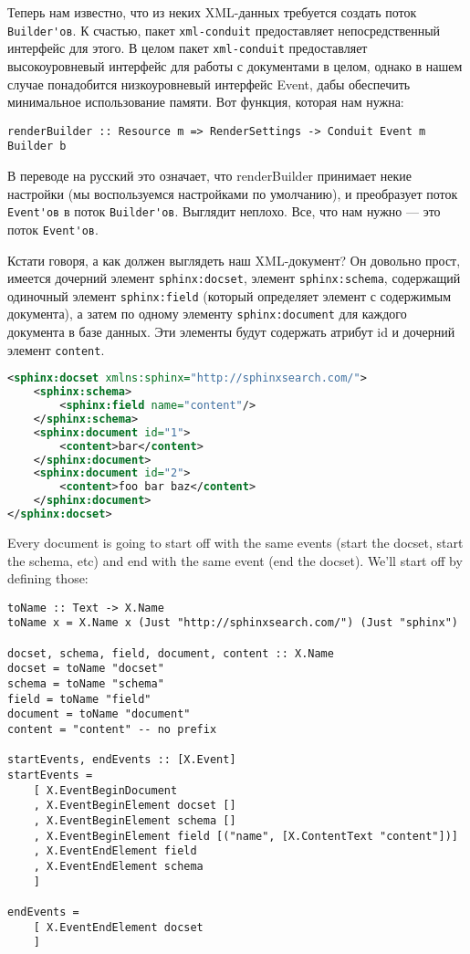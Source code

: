 Теперь нам известно, что из неких XML-данных требуется создать поток \lstinline`Builder'ов`. К счастью, пакет \lstinline'xml-conduit' предоставляет непосредственный интерфейс для этого. В целом пакет \lstinline'xml-conduit' предоставляет высокоуровневый интерфейс для работы с документами в целом, однако в нашем случае понадобится низкоуровневый интерфейс Event, дабы обеспечить минимальное использование памяти. Вот функция, которая нам нужна:

\begin{lstlisting}
renderBuilder :: Resource m => RenderSettings -> Conduit Event m Builder b
\end{lstlisting}

В переводе на русский это означает, что renderBuilder принимает некие настройки (мы воспользуемся настройками по умолчанию), и преобразует поток \lstinline`Event'ов` в поток \lstinline`Builder'ов`. Выглядит неплохо. Все, что нам нужно --- это поток \lstinline`Event'ов`.

Кстати говоря, а как должен выглядеть наш XML-документ? Он довольно прост, имеется дочерний элемент \lstinline'sphinx:docset', элемент \lstinline'sphinx:schema', содержащий одиночный элемент \lstinline'sphinx:field' (который определяет элемент с содержимым документа), а затем по одному элементу \lstinline'sphinx:document' для каждого документа в базе данных. Эти элементы будут содержать атрибут id и дочерний элемент \lstinline'content'.

\begin{lstlisting}[language=XML] % Пример xmlpipe-документа / Sample xmlpipe document
<sphinx:docset xmlns:sphinx="http://sphinxsearch.com/">
    <sphinx:schema>
        <sphinx:field name="content"/>
    </sphinx:schema>
    <sphinx:document id="1">
        <content>bar</content>
    </sphinx:document>
    <sphinx:document id="2">
        <content>foo bar baz</content>
    </sphinx:document>
</sphinx:docset>
\end{lstlisting}

Every document is going to start off with the same events (start the docset, start the schema, etc) and end with the same event (end the docset). We'll start off by defining those:

\begin{lstlisting}
toName :: Text -> X.Name
toName x = X.Name x (Just "http://sphinxsearch.com/") (Just "sphinx")

docset, schema, field, document, content :: X.Name
docset = toName "docset"
schema = toName "schema"
field = toName "field"
document = toName "document"
content = "content" -- no prefix

startEvents, endEvents :: [X.Event]
startEvents =
    [ X.EventBeginDocument
    , X.EventBeginElement docset []
    , X.EventBeginElement schema []
    , X.EventBeginElement field [("name", [X.ContentText "content"])]
    , X.EventEndElement field
    , X.EventEndElement schema
    ]

endEvents =
    [ X.EventEndElement docset
    ]
\end{lstlisting}

